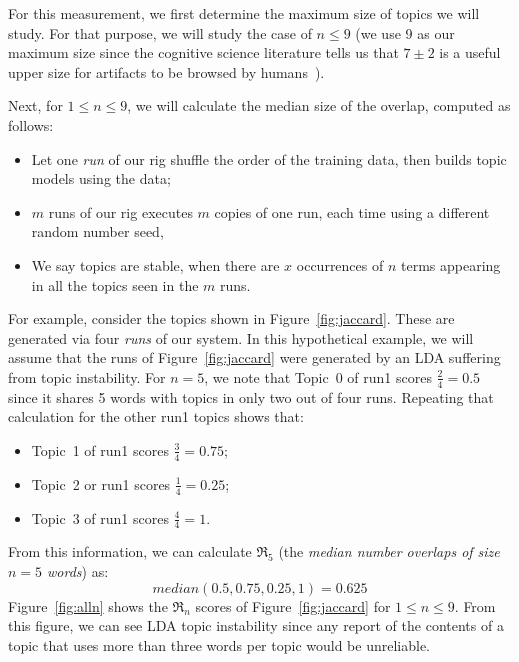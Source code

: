 \documentclass[twocolumn,5p,sort&compress]{elsarticle}
\newcommand{\bi}{\begin{itemize}}
\newcommand{\ei}{\end{itemize}}
\theoremstyle{break}
\begin{document}
 


For this measurement, we first determine the maximum size of topics we will study. For that purpose,
we will study the case of $n \le 9$ (we use 9 as our maximum size since the cognitive
science literature tells us that $7\pm 2$ is a useful upper size for artifacts to be browsed by humans~\cite{miller1956magical}).


Next, for $1 \le n \le 9$, we will calculate the median size of the overlap,
computed as follows:
\bi
\item Let one {\em run} of our rig shuffle the order of the training data, then builds topic models using the data;
  \item $m$ runs of our rig executes $m$ copies of one run, each time using a different random number seed,
\item We say topics are stable,
when there are $x$ occurrences of  $n$ terms appearing in all the topics seen in the $m$ runs.
\ei


For example, consider the topics shown in Figure~\ref{fig:jaccard}. These are generated via four {\em runs} of our system. In this hypothetical example, we will assume that the runs of
 Figure~\ref{fig:jaccard} were generated by an LDA suffering from topic instability.
For $n=5$, we note that Topic~0 of run1 scores $\frac{2}{4}=0.5$ since it shares 5 words with topics in only two out of four runs.
Repeating that calculation for the other run1 topics shows that:
\bi
\item Topic~1 of run1 scores $\frac{3}{4}=0.75$;
\item Topic~2 or run1 scores $\frac{1}{4}=0.25$;
\item Topic~3 of run1 scores $\frac{4}{4}=1$.
  \ei
  From this information, we can calculate
  $\Re_5$  (the
  {\em median number overlaps of size $n=5$ words}) as:
  \[
   \mathit{median}(0.5, 0.75, 0.25, 1) =0.625\]
  Figure~\ref{fig:alln}
  shows the $\Re_n$ scores of 
  Figure~\ref{fig:jaccard} for $1 \le n \le 9$.  From this figure, we can see LDA topic instability
  since
  any report of the contents of a topic that uses more than three words per topic would be unreliable.
\end{document}
